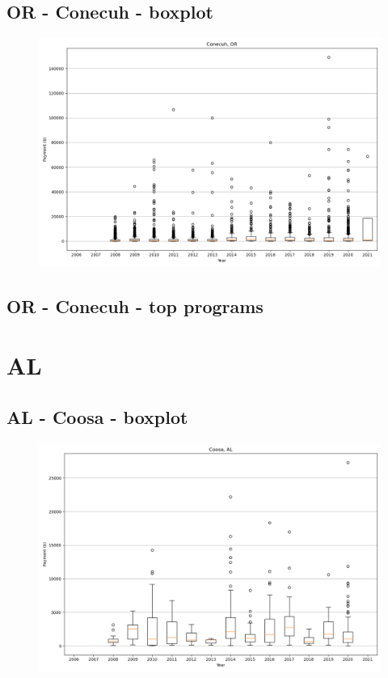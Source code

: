 \subsection*{OR - Conecuh - boxplot}
\begin{figure}[h]
\centering
\includegraphics[width=7in]{../output/boxplots/counties/Conecuh-OR_boxplot.png}
\end{figure}


\subsection*{OR - Conecuh - top programs}

\newpage
\section*{AL}
\subsection*{AL - Coosa - boxplot}
\begin{figure}[h]
\centering
\includegraphics[width=7in]{../output/boxplots/counties/Coosa-AL_boxplot.png}
\end{figure}


